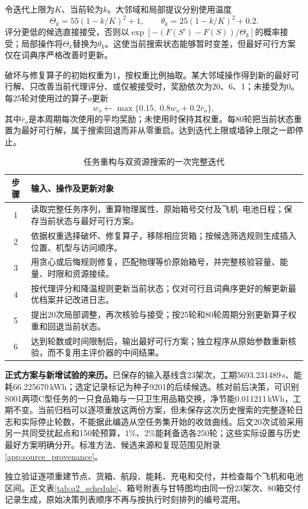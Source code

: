令迭代上限为$K$、当前轮为$k$。大邻域和局部提议分别使用温度
\begin{equation}
 \Theta_k=55(1-k/K)^2+1,\qquad
 \theta_k=25(1-k/K)^2+0.2.
 \label{eq:q2_temperature}
\end{equation}
评分更低的候选直接接受，否则以$\exp[-(F(S')-F(S))/\Theta_k]$的概率接受；局部操作将$\Theta_k$替换为$\theta_k$。这使当前搜索状态能够暂时变差，但最好可行方案仅在词典序严格改善时更新。

破坏与修复算子的初始权重为1，按权重比例抽取。某大邻域操作得到新的最好可行解、只改善当前代理评分、或仅被接受时，奖励依次为20、6、1；未接受为0。每25轮对使用过的算子$o$更新
\begin{equation}
 w_o\leftarrow\max\{0.15,\;0.8w_o+0.2\bar r_o\},
 \label{eq:q2_operator_weight}
\end{equation}
其中$\bar r_o$是本周期每次使用的平均奖励；未使用时保持其权重。每80轮把当前状态重置为最好可行解，属于搜索回退而非从零重启。达到迭代上限或墙钟上限之一即停止。

\begin{table}[htbp]\centering\small
\caption{任务重构与双资源搜索的一次完整迭代}\label{tab:q2_algorithm}
\begin{tabularx}{\linewidth}{cX}\toprule
步骤 & 输入、操作及更新对象\\\midrule
1 & 读取完整任务序列，重算物理属性、原始箱号交付及飞机--电池日程；保存当前状态与最好可行方案。\\
2 & 依据权重选择破坏、修复算子，移除相应货箱；按候选筛选规则生成插入位置、机型与访问顺序。\\
3 & 用贪心或后悔规则修复，匹配物理等价原始箱号，并完整核验容量、能量、时限和资源接续。\\
4 & 按代理评分和降温规则更新当前状态；仅对可行且词典序更好的解更新最优档案并记改进日志。\\
5 & 提出20次局部调整，再次核验与接受；按25轮和80轮周期分别更新算子权重和回退当前状态。\\
6 & 达到轮数或时间限制后，输出最好可行方案；独立程序从原始参数重新核验，而不复用主评价器的中间结果。\\\bottomrule
\end{tabularx}
\end{table}

\textbf{正式方案与新增试验的来历。}已保存的输入基线含23架次，工期5693.231489\,s、能耗66.225670\,kWh；选定记录标记为种子9201的后续候选。核对前后决策，可识别S001两项C型任务的一只食品箱与一只卫生用品箱交换，净节能0.011211\,kWh，工期不变。当前归档可以逐项重放这两份方案，但未保存这次历史搜索的完整逐轮日志和实际停止轮数，不能据此编造从空任务集开始的收敛曲线。后文20次试验采用另一共同受扰起点和150轮预算，1\%、2\%能耗备选各250轮；这些实际设置与历史最好方案明确分开。标准方法、候选来源和复现范围见附录\ref{app:source_provenance}。

独立验证逐项重建节点、货箱、航段、能耗、充电和交付，并检查每个飞机和电池区间。正文表\ref{tab:q2_schedule}、箱号附表与甘特图均由同一份23架次、80箱交付记录生成，原始决策列表顺序不再与按执行时刻排列的编号混用。
